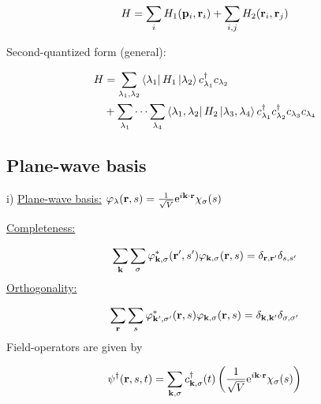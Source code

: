 \begin{equation}
	H= \sum_i H_1(\vb{p}_i, \vb{r}_i) + \sum_{i,j} H_2 (\vb{r}_i, \vb{r}_j )
\end{equation}

\begin{tcolorbox}
	\noindent Second-quantized form (general):
	
	\begin{align}
		H & = \sum_{\lambda_{1}, \lambda_{2}} \bra{\lambda_{1}} H_1 \ket{\lambda_{2}} c^{\dagger}_{\lambda_1} c_{\lambda_2} \nonumber \\
		&+ \sum_{\lambda_{1}} \cdots \sum_{\lambda_{4}} \bra{\lambda_{1}, \lambda_{2}} H_2 \ket{\lambda_{3}, \lambda_{4}} c^{\dagger}_{\lambda_1} c^{\dagger}_{\lambda_2} c_{\lambda_{3}} c_{\lambda_{4}}
	\end{align}
\end{tcolorbox}
\linebreak

\subsection{Plane-wave basis}

\noindent i) \uline{Plane-wave basis:}  ${\varphi_{\lambda} (\vb{r},s) = \frac{1}{\sqrt{V}} \mathrm{e}^{i \vb{k}\cdot \vb{r}} \chi_\sigma (s)  }$ \\
\linebreak

\noindent \uline{Completeness:}

\begin{equation}
	\sum_{\vb{k}} \sum_{\sigma} \varphi_{\vb{k}, \sigma}^* (\vb{r}', s') \varphi_{\vb{k}, \sigma} (\vb{r}, s) = \delta_{\vb{r}, \vb{r}'} \delta_{s,s'}
\end{equation}
\linebreak
\noindent \uline{Orthogonality:}

\begin{equation}
	\sum_{\vb{r}} \sum_{s} \varphi_{\vb{k}', \sigma'}^* (\vb{r}, s) \varphi_{\vb{k}, \sigma} (\vb{r}, s) = \delta_{\vb{k}, \vb{k}'} \delta_{\sigma,\sigma'}
\end{equation}
\linebreak
\noindent Field-operators are given by

\begin{equation}
	\psi^\dagger (\vb{r},s,t) = \sum_{\vb{k}, \sigma} c^{\dagger}_{\vb{k}, \sigma} (t) \left( \frac{1}{\sqrt{V}} \mathrm{e}^{i \vb{k} \cdot \vb{r}} \chi_\sigma (s) \right)
\end{equation}

